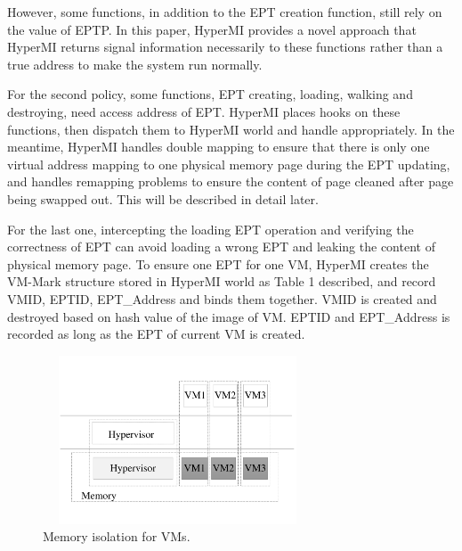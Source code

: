 \documentclass[conference]{IEEEtran}
\begin{document}
However, some functions, in addition to the EPT creation function, still rely on the value of EPTP. In this paper, HyperMI provides a novel approach that HyperMI returns signal information necessarily to these functions rather than a true address to make the system run normally. 



For the second policy, some functions, EPT creating, loading, walking and destroying, need access address of EPT. HyperMI places hooks on these functions, then dispatch them to HyperMI world and handle appropriately. In the meantime, HyperMI handles double mapping to ensure that there is only one virtual address mapping to one physical memory page during the EPT updating, and handles remapping problems to ensure the content of page cleaned after page being swapped out. This will be described in detail later.



For the last one, intercepting the loading EPT operation and verifying the correctness of EPT can avoid loading a wrong EPT and leaking the content of physical memory page. To ensure one EPT for one VM, HyperMI creates the VM-Mark structure stored in HyperMI world as Table 1 described, and record VMID, EPTID, EPT\_Address and binds them together. VMID is created and destroyed based on hash value of the image of VM. EPTID and EPT\_Address is recorded as long as the EPT of current VM is created.




\begin{figure}
\centerline{\includegraphics[width=8cm, height=5cm]{pdfvmcs3.pdf}}%
\caption{Memory isolation for VMs.} \label{fig3}
\end{figure}
\end{document}
